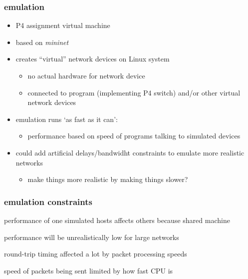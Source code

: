 \begin{frame}
\frametitle{emulation}
\begin{itemize}
\item P4 assignment virtual machine
\item based on \textit{mininet}
\item creates ``virtual'' network devices on Linux system
    \begin{itemize}
    \item no actual hardware for network device
    \item connected to program (implementing P4 switch) and/or other virtual network devices
    \end{itemize}
\item emulation runs `as fast as it can':
    \begin{itemize}
    \item performance based on speed of programs talking to simulated devices
    \end{itemize}
\item could add artificial delays/bandwidht constraints to emulate more realistic networks
    \begin{itemize}
    \item make things more realistic by making things slower?
    \end{itemize}
\end{itemize}
\end{frame}

\begin{frame}
\frametitle{emulation constraints}
\vspace{.5cm}
\item performance of one simulated hosts affects others because shared machine
\item performance will be unrealistically low for large networks
\item round-trip timing affected a lot by packet processing speeds
\item speed of packets being sent limited by how fast CPU is
\end{frame}
